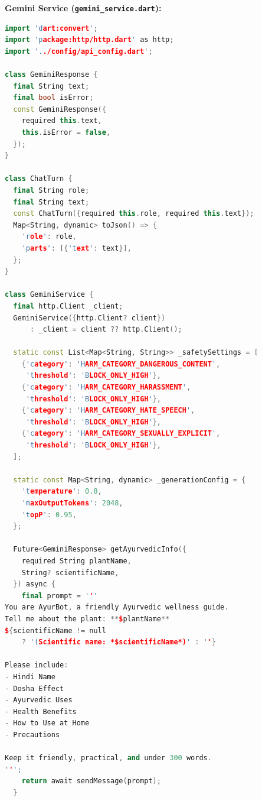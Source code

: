 \textbf{Gemini Service (\texttt{gemini\_service.dart}):}
\begin{lstlisting}[language=C++]
import 'dart:convert';
import 'package:http/http.dart' as http;
import '../config/api_config.dart';

class GeminiResponse {
  final String text;
  final bool isError;
  const GeminiResponse({
    required this.text,
    this.isError = false,
  });
}

class ChatTurn {
  final String role;
  final String text;
  const ChatTurn({required this.role, required this.text});
  Map<String, dynamic> toJson() => {
    'role': role,
    'parts': [{'text': text}],
  };
}

class GeminiService {
  final http.Client _client;
  GeminiService({http.Client? client})
      : _client = client ?? http.Client();

  static const List<Map<String, String>> _safetySettings = [
    {'category': 'HARM_CATEGORY_DANGEROUS_CONTENT',
     'threshold': 'BLOCK_ONLY_HIGH'},
    {'category': 'HARM_CATEGORY_HARASSMENT',
     'threshold': 'BLOCK_ONLY_HIGH'},
    {'category': 'HARM_CATEGORY_HATE_SPEECH',
     'threshold': 'BLOCK_ONLY_HIGH'},
    {'category': 'HARM_CATEGORY_SEXUALLY_EXPLICIT',
     'threshold': 'BLOCK_ONLY_HIGH'},
  ];

  static const Map<String, dynamic> _generationConfig = {
    'temperature': 0.8,
    'maxOutputTokens': 2048,
    'topP': 0.95,
  };

  Future<GeminiResponse> getAyurvedicInfo({
    required String plantName,
    String? scientificName,
  }) async {
    final prompt = '''
You are AyurBot, a friendly Ayurvedic wellness guide.
Tell me about the plant: **$plantName**
${scientificName != null
    ? '(Scientific name: *$scientificName*)' : ''}

Please include:
- Hindi Name
- Dosha Effect
- Ayurvedic Uses
- Health Benefits
- How to Use at Home
- Precautions

Keep it friendly, practical, and under 300 words.
''';
    return await sendMessage(prompt);
  }


\end{lstlisting}

